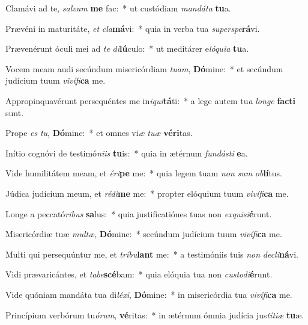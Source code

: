 \item Clamávi ad te, \textit{sal}\textit{vum} \textbf{me} fac:~* ut custódiam \textit{man}\textit{dá}\textit{ta} \textbf{tu}a.
\item Prævéni in maturitáte, \textit{et} \textit{cla}\textbf{má}vi:~* quia in verba tua \textit{su}\textit{per}\textit{spe}\textbf{rá}vi.
\item Prævenérunt óculi mei ad \textit{te} \textit{di}\textbf{lú}culo:~* ut meditárer e\textit{ló}\textit{qui}\textit{a} \textbf{tu}a.
\item Vocem meam audi secúndum misericórdiam \textit{tu}\textit{am}, \textbf{Dó}mine:~* et secúndum judícium tuum \textit{vi}\textit{ví}\textit{fi}\textbf{ca} me.
\item Appropinquavérunt persequéntes me in\textit{i}\textit{qui}\textbf{tá}ti:~* a lege autem tu\textit{a} \textit{lon}\textit{ge} \textbf{fac}\textbf{ti} sunt.
\item Prope \textit{es} \textit{tu}, \textbf{Dó}mine:~* et omnes vi\textit{æ} \textit{tu}\textit{æ} \textbf{vé}\textbf{ri}tas.
\item Inítio cognóvi de testimó\textit{ni}\textit{is} \textbf{tu}is:~* quia in ætérnum \textit{fun}\textit{dás}\textit{ti} \textbf{e}a.
\item Vide humilitátem meam, et \textit{é}\textit{ri}\textbf{pe} me:~* quia legem tuam \textit{non} \textit{sum} \textit{ob}\textbf{lí}tus.
\item Júdica judícium meum, et \textit{réd}\textit{i}\textbf{me} me:~* propter elóquium tuum \textit{vi}\textit{ví}\textit{fi}\textbf{ca} me.
\item Longe a peccató\textit{ri}\textit{bus} \textbf{sa}lus:~* quia justificatiónes tuas non \textit{ex}\textit{qui}\textit{si}\textbf{é}runt.
\item Misericórdiæ tuæ \textit{mul}\textit{tæ}, \textbf{Dó}mine:~* secúndum judícium tuum \textit{vi}\textit{ví}\textit{fi}\textbf{ca} me.
\item Multi qui persequúntur me, et \textit{trí}\textit{bu}\textbf{lant} me:~* a testimóniis tuis \textit{non} \textit{de}\textit{cli}\textbf{ná}vi.
\item Vidi prævaricántes, et \textit{ta}\textit{be}\textbf{scé}bam:~* quia elóquia tua non \textit{cus}\textit{to}\textit{di}\textbf{é}runt.
\item Vide quóniam mandáta tua di\textit{lé}\textit{xi}, \textbf{Dó}mine:~* in misericórdia tua \textit{vi}\textit{ví}\textit{fi}\textbf{ca} me.
\item Princípium verbórum tu\textit{ó}\textit{rum}, \textbf{vé}ritas:~* in ætérnum ómnia judícia jus\textit{tí}\textit{ti}\textit{æ} \textbf{tu}æ.
